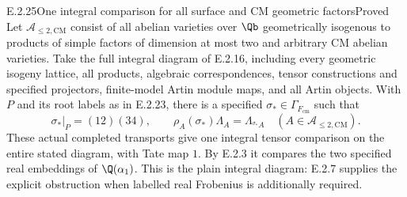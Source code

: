 \begin{result}{E.2.25}{One integral comparison for all surface and CM geometric factors}{Proved}
Let \(\mathcal A_{\leq2,\mathrm{CM}}\) consist of all
abelian varieties over \(\Qb\) geometrically isogenous to
products of simple factors of dimension at most two and
arbitrary CM abelian varieties. Take the full integral
diagram of E.2.16, including every geometric isogeny
lattice, all products, algebraic correspondences, tensor
constructions and specified projectors, finite-model
Artin module maps, and all Artin objects.
With \(P\) and its root labels as in E.2.23, there is a
specified \(\sigma_*\in\Gamma_{F_{\mathrm{cm}}}\) such that
\[
 \sigma_*|_P=(12)(34),\qquad
 \rho_A(\sigma_*)\Lambda_A
       =\Lambda_{{}^{\sigma_*}A}
       \quad(A\in\mathcal A_{\leq2,\mathrm{CM}}).
 \tag{E.2.25a}
\]
These actual completed transports give one integral
tensor comparison on the entire stated diagram, with
Tate map \(1\). By E.2.3 it compares the two specified
real embeddings of \(\Q(\alpha_1)\). This is the plain
integral diagram: E.2.7 supplies the explicit obstruction
when labelled real Frobenius is additionally required.
\end{result}
